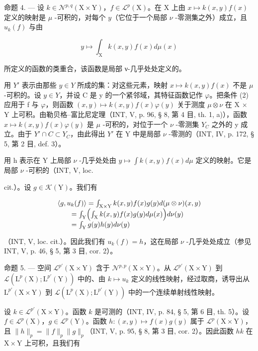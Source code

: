 命题 4. --- 设 \(k \in \mathcal{N}^{p,q}(\mathrm{X} \times \mathrm{Y})\)，\(f \in \mathcal{L}^p(\mathrm{X})\)。在 \(\mathrm{X}\) 上由 \(x \mapsto k(x,y)f(x)\) 定义的映射是 \(\mu\) -可积的，对每个 \(y\)（它位于一个局部 \(\nu\) -零测集之外）成立，且 \(u_k(f)\) 与由

\[
y \mapsto \int_ {\mathrm{X}} k (x, y) f (x) d \mu (x)
\]

所定义的函数的类重合，该函数是局部 ν-几乎处处定义的。

用 \(Y'\) 表示由那些 \(y \in Y\) 所成的集：对这些元素，映射 \(x \mapsto k(x, y)f(x)\) 不是 \(\mu\) -可积的。设 \(y \in Y\)，并设 C 是 y 的一个紧邻域，其特征函数记作 \(\varphi\)。把条件 (2) 应用于 f 与 \(\varphi\)，则函数 \((x, y) \mapsto k(x, y)f(x)\varphi(y)\) 关于测度 \(\mu \otimes \nu\) 在 X × Y 上可积。由勒贝格--富比尼定理（INT, V, p. 96, § 8, 第 4 目, th. 1, a)），函数 \(x \mapsto k(x, y)f(x)\varphi(y)\) 是 \(\mu\) -可积的，对位于一个 \(\nu\) -零测集 \(Y_{C}\) 之外的 y 成立。由于 \(Y' \cap C \subset Y_{C}\)，由此得出 \(Y'\) 在 Y 中是局部 \(\nu\) -零测的（INT, IV, p. 172, § 5, 第 2 目, def. 3）。

用 h 表示在 Y 上局部 \(\nu\) -几乎处处由 \(y \mapsto \int k(x, y)f(x)d\mu\) 定义的映射。它是局部 \(\nu\) -可积的（INT, V, loc.

cit.）。设 \(g \in \mathcal{K}(\mathrm{Y})\)。我们有

\[
\begin{array}{l} \langle g, u _ {k} (f) \rangle = \int_ {\mathrm{X} \times \mathrm{Y}} k (x, y) f (x) g (y) d (\mu \otimes \nu) (x, y) \\ \qquad = \int_ {\mathrm{Y}} \Bigl (\int_ {\mathrm{X}} k (x, y) f (x) g (y) d \mu (x) \Bigr) d \nu (y) \\ \qquad = \int_ {\mathrm{Y}} g (y) h (y) d \nu (y) \end{array}
\]

（INT, V, loc. cit.）。因此我们有 \(u_{k}(f) = h\)，这在局部 \(\nu\) -几乎处处成立（参见 INT, V, p. 46, § 5, 第 3 目, cor. 2）。

命题 5. --- 空间 \(\mathcal{L}^{p'}(\mathrm{X}\times\mathrm{Y})\) 含于 \(\mathcal{N}^{p,p}(\mathrm{X}\times\mathrm{Y})\)。从 \(\mathcal{L}^{p'}(\mathrm{X}\times\mathrm{Y})\) 到 \(\mathcal{L}(\mathrm{L}^{p}(\mathrm{X});\mathrm{L}^{p'}(\mathrm{Y}))\) 中的、由 \(k\mapsto u_{k}\) 定义的线性映射，经过取商，诱导出从 \(\mathrm{L}^{p'}(\mathrm{X}\times\mathrm{Y})\) 到 \(\mathcal{L}(\mathrm{L}^{p}(\mathrm{X});\mathrm{L}^{p'}(\mathrm{Y}))\) 中的一个连续单射线性映射。

设 \(k \in \mathcal{L}^{p'}(\mathrm{X} \times \mathrm{Y})\)。函数 \(k\) 是可测的（INT, IV, p. 84, § 5, 第 6 目, th. 5）。设 \(f \in \mathcal{L}^p(\mathrm{X})\)，\(g \in \mathcal{L}^p(\mathrm{Y})\)。函数 \(h \colon (x,y) \mapsto f(x)g(y)\) 属于 \(\mathcal{L}^p(\mathrm{X} \times \mathrm{Y})\)，且 \(\|h\|_p = \|f\|_p \|g\|_p\)（INT, V, p. 95, § 8, 第 3 目, cor. 2）。因此函数 \(hk\) 在 \(\mathrm{X} \times \mathrm{Y}\) 上可积，且我们有

